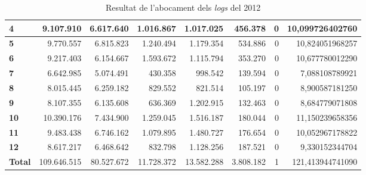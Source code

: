 \begin{table}[h!]
\begin{adjustbox}{width=1.2\textwidth, center}
\begin{tabular}{|l|r|r|r|r|r|r|r|}
            \textbf{4}     & 9.107.910   & 6.617.640  & 1.016.867  & 1.017.025  & 456.378   & 0 & 10,099726402760  \\
            \midrule
            \textbf{5}     & 9.770.557   & 6.815.823  & 1.240.494  & 1.179.354  & 534.886   & 0 & 10,824051968257  \\
            \textbf{6}     & 9.217.403   & 6.154.667  & 1.593.672  & 1.115.794  & 353.270   & 0 & 10,677780012290  \\
            \textbf{7}     & 6.642.985   & 5.074.491  & 430.358    & 998.542    & 139.594   & 0 & 7,088108789921   \\
            \textbf{8}     & 8.015.445   & 6.259.182  & 829.552    & 821.514    & 105.197   & 0 & 8,900587181250   \\
            \midrule
            \textbf{9}     & 8.107.355   & 6.135.608  & 636.369    & 1.202.915  & 132.463   & 0 & 8,684779071808   \\
            \textbf{10}    & 10.390.176  & 7.434.900  & 1.259.045  & 1.516.187  & 180.044   & 0 & 11,150239658356  \\
            \textbf{11}    & 9.483.438   & 6.746.162  & 1.079.895  & 1.480.727  & 176.654   & 0 & 10,052967178822  \\
            \textbf{12}    & 8.617.217   & 6.468.642  & 832.798    & 1.128.256  & 187.521   & 0 & 9,330152344704   \\
            \midrule
            \textbf{Total} & 109.646.515 & 80.527.672 & 11.728.372 & 13.582.288 & 3.808.182 & 1 & 121,413944741090 \\
            \bottomrule
        \end{tabular}
    \end{adjustbox}
    \caption{Resultat de l'abocament dels \textit{logs} del 2012}
    \label{tab:logs-table-2012}
\end{table}
